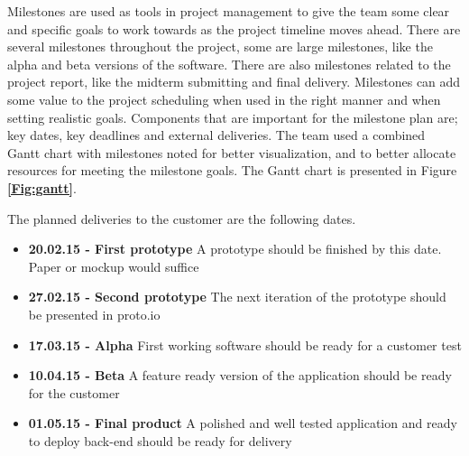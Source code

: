 Milestones are used as tools in project management to give the team some clear and specific goals to work towards as the project timeline moves ahead. There are several milestones throughout the project, some are large milestones, like the alpha and beta versions of the software. There are also milestones related to the project report, like the midterm submitting and final delivery. Milestones can add some value to the project scheduling when used in the right manner and when setting realistic goals. Components that are important for the milestone plan are; key dates, key deadlines and external deliveries. The team used a combined Gantt chart with milestones noted for better visualization, and to better allocate resources for meeting the milestone goals. The Gantt chart is presented in Figure \textbf{\ref{Fig:gantt}}.\newline


The planned deliveries to the customer are the following dates. 
\begin{itemize}
\item \textbf{20.02.15 - First prototype} \newline
A prototype should be finished by this date. Paper or mockup would suffice  
\item \textbf{27.02.15 - Second prototype}  \newline
The next iteration of the prototype should be presented in proto.io \cite{protoIO}
\item \textbf{17.03.15 - Alpha} \newline
First working software should be ready for a customer test
\item \textbf{10.04.15 - Beta}  \newline
A feature ready version of the application should be ready for the customer 
\item \textbf{01.05.15 - Final product} \newline
A polished and well tested application and ready to deploy back-end should be ready for delivery 
\end{itemize}



